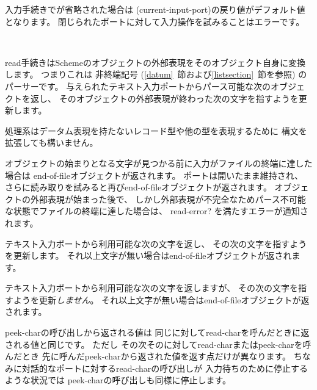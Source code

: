 入力手続きでが省略された場合は
{\cf (current-\+input-\+port)}の戻り値がデフォルト値となります。
閉じられたポートに対して入力操作を試みることはエラーです。

\noindent \hbox{ }  %
\vspace{-5ex}


\begin{entry}{%
}

{\cf read}手続きはSchemeのオブジェクトの外部表現をそのオブジェクト自身に変換します。
つまりこれは
非終端記号  (\ref{datum}~節および\ref{listsection}~節を参照)
のパーサーです。
与えられたテキスト入力ポートからパース可能な次のオブジェクトを返し、
そのオブジェクトの外部表現が終わった次の文字を指すようを更新します。

処理系はデータム表現を持たないレコード型や他の型を表現するために
構文を拡張しても構いません。

\vest オブジェクトの始まりとなる文字が見つかる前に入力がファイルの終端に達した場合は
end-of-fileオブジェクトが返されます。
ポートは開いたまま維持され、
さらに読み取りを試みると再びend-of-fileオブジェクトが返されます。
オブジェクトの外部表現が始まった後で、
しかし外部表現が不完全なためパース不可能な状態でファイルの終端に達した場合は、
{\cf read-error?} を満たすエラーが通知されます。

\end{entry}

\begin{entry}{%
}

テキスト入力ポートから利用可能な次の文字を返し、
その次の文字を指すようを更新します。
それ以上文字が無い場合はend-of-fileオブジェクトが返されます。

\end{entry}


\begin{entry}{%
}

テキスト入力ポートから利用可能な次の文字を返しますが、
その次の文字を指すようを更新{\em しません}。
それ以上文字が無い場合はend-of-fileオブジェクトが返されます。

\begin{note}
{\cf peek-char}の呼び出しから返される値は
同じに対して{\cf read-char}を呼んだときに返される値と同じです。
ただし
その次そのに対して{\cf read-char}または{\cf peek-char}を呼んだとき
先に呼んだ{\cf peek-char}から返された値を返す点だけが異なります。
ちなみに対話的なポートに対する{\cf read-char}の呼び出しが
入力待ちのために停止するような状況では
{\cf peek-char}の呼び出しも同様に停止します。
\end{note}

\end{entry}

